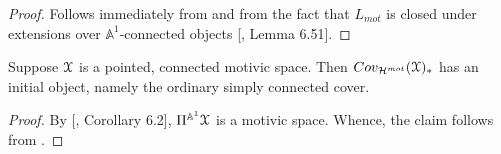 \begin{proof}
Follows immediately from  and from the fact that $L_{mot}$ is closed under extensions over $\mathbb{A}^1$-connected objects [\cite{morel2012a1}, Lemma 6.51].
\end{proof}
\begin{cor}
Suppose $\EuScript{X}$ is a pointed, connected motivic space. Then $Cov_{\mathcal{H}^{mot}}(\EuScript{X})_*$ has an initial object, namely the ordinary simply connected cover. 
\end{cor}
\begin{proof}
    By [\cite{morel2012a1}, Corollary 6.2], $\Pi^{\mathbb{A}^1}\EuScript{X}$ is a motivic space. Whence, the claim follows from . 
\end{proof}

